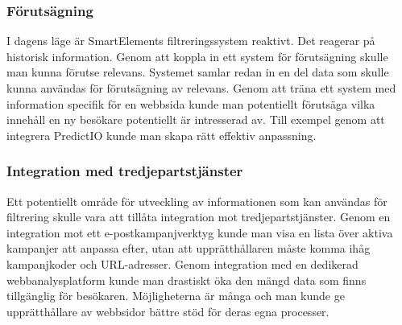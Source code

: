 \subsubsection{Förutsägning}

I dagens läge är SmartElements filtreringssystem reaktivt. Det reagerar på historisk information. Genom att koppla in ett system för förutsägning skulle man kunna förutse relevans. Systemet samlar redan in en del data som skulle kunna användas för förutsägning av relevans. Genom att träna ett system med information specifik för en webbsida kunde man potentiellt förutsäga vilka innehåll en ny besökare potentiellt är intresserad av. Till exempel genom att integrera PredictIO kunde man skapa rätt effektiv anpassning.

\subsubsection{Integration med tredjepartstjänster}

Ett potentiellt område för utveckling av informationen som kan användas för filtrering skulle vara att tillåta integration mot tredjepartstjänster. Genom en integration mot ett e-postkampanjverktyg kunde man visa en lista över aktiva kampanjer att anpassa efter, utan att upprätthållaren måste komma ihåg kampanjkoder och URL-adresser. Genom integration med en dedikerad webbanalysplatform kunde man drastiskt öka den mängd data som finns tillgänglig för besökaren. Möjligheterna är många och man kunde ge upprätthållare av webbsidor bättre stöd för deras egna processer.


